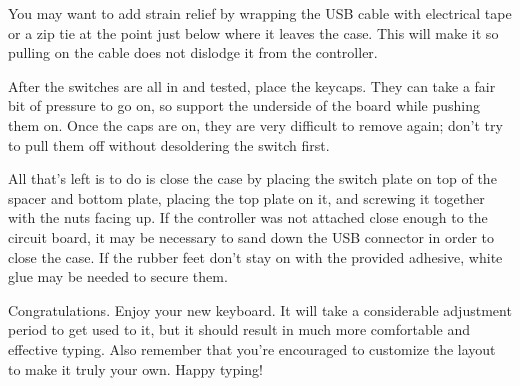 \documentclass{article}
\begin{document}
\vspace{1em}

You may want to add strain relief by wrapping the USB cable with
electrical tape or a zip tie at the point just below where it leaves
the case. This will make it so pulling on the cable does not dislodge
it from the controller.

\vspace{1em}

After the switches are all in and tested, place the keycaps. They can
take a fair bit of pressure to go on, so support the underside of the
board while pushing them on. Once the caps are on, they are very
difficult to remove again; don't try to pull them off without
desoldering the switch first.

\vspace{1em}

All that's left is to do is close the case by placing the switch plate
on top of the spacer and bottom plate, placing the top plate on it,
and screwing it together with the nuts facing up. If the controller
was not attached close enough to the circuit board, it may be
necessary to sand down the USB connector in order to close the
case. If the rubber feet don't stay on with the provided adhesive,
white glue may be needed to secure them.

\vspace{1em}

Congratulations. Enjoy your new keyboard. It will take a
considerable adjustment period to get used to it, but it should result
in much more comfortable and effective typing. Also remember that
you're encouraged to customize the layout to make it truly your
own. Happy typing!

\end{document}
